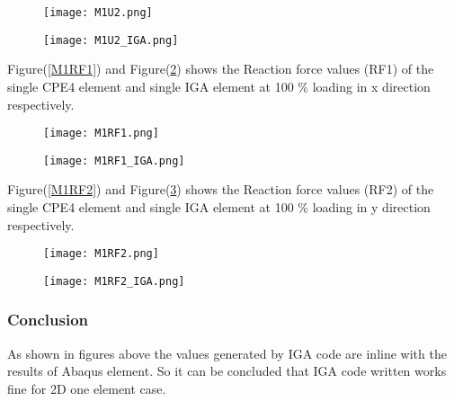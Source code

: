 \documentclass[11pt]{article}
\begin{document}
\begin{figure}[H]
	\centering
	\begin{minipage}{.5\textwidth}
		\centering
		\texttt{[image: M1U2.png]}
		\label{M1U2}
	\end{minipage}%
	\begin{minipage}{.5\textwidth}
		\centering
		\texttt{[image: M1U2\_IGA.png]}
		\label{M1U2_IGA}
	\end{minipage}
\end{figure}

\newpage

Figure(\ref{M1RF1}) and Figure(\ref{M1RF1_IGA}) shows the Reaction force values (RF1) of the single CPE4 element and single IGA element at 100 \% loading in x direction respectively. \\
\begin{figure}[H]
	\centering
	\begin{minipage}{.5\textwidth}
		\centering
		\texttt{[image: M1RF1.png]}
		\label{M1RF1}
	\end{minipage}%
	\begin{minipage}{.5\textwidth}
		\centering
		\texttt{[image: M1RF1\_IGA.png]}
		\label{M1RF1_IGA}
	\end{minipage}
\end{figure}
Figure(\ref{M1RF2}) and Figure(\ref{M1RF2_IGA}) shows the Reaction force values (RF2) of the single CPE4 element and single IGA element at 100 \% loading in y direction respectively. \\
\begin{figure}[H]
	\centering
	\begin{minipage}{.5\textwidth}
		\centering
		\texttt{[image: M1RF2.png]}
		\label{M1RF2}
	\end{minipage}%
	\begin{minipage}{.5\textwidth}
		\centering
		\texttt{[image: M1RF2\_IGA.png]}
		\label{M1RF2_IGA}
	\end{minipage}
\end{figure}
\subsubsection{Conclusion}
As shown in figures above the values generated by IGA code are inline with the results of Abaqus element. So it can be concluded that IGA code written works fine for 2D one element case.
\end{document}
